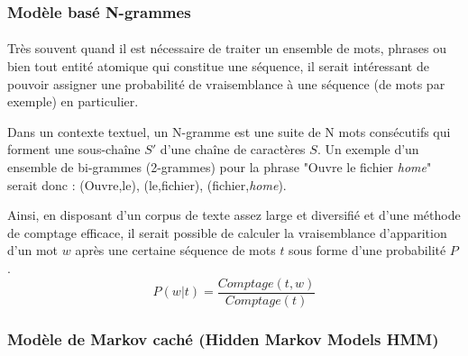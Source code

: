 	\subsubsection{Modèle basé N-grammes}
	\label{n-grams}
	\paragraph{}
	Très souvent quand il est nécessaire de traiter un ensemble de mots, phrases ou bien tout entité atomique qui constitue une séquence, il serait intéressant de pouvoir assigner une probabilité de vraisemblance à une séquence (de mots par exemple) en particulier. 
	\par Dans un contexte textuel, un N-gramme est une suite de N mots consécutifs qui forment une sous-chaîne $S\prime$ d'une chaîne de caractères $S$. Un exemple d'un ensemble de bi-grammes (2-grammes) pour la phrase "Ouvre le fichier \textit{home}" serait donc : (Ouvre,le), (le,fichier), (fichier,\textit{home}).
	\par 
	Ainsi, en disposant d'un corpus de texte assez large et diversifié et d'une méthode de comptage efficace, il serait possible de calculer la vraisemblance d'apparition d'un mot $w$ après une certaine séquence de mots $t$ sous forme d'une probabilité $P$ \cite{nlp_ngrams}.
	\begin{equation}
		P(w|t) = \frac{Comptage(t,w)}{Comptage(t)}
	\end{equation}
	\subsubsection{Modèle de Markov caché (Hidden Markov Models HMM)}
